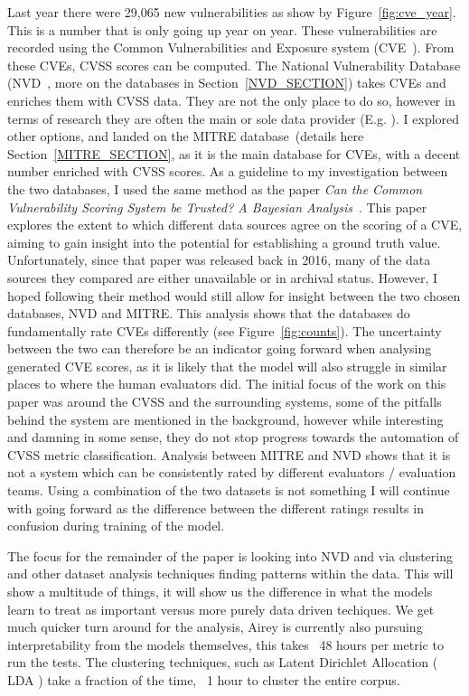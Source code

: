 \documentclass[12pt]{article}
\begin{document}
Last year there were 29,065 new vulnerabilities as show by Figure~\ref{fig:cve_year}. This is a
number that is only going up year on year. These vulnerabilities are recorded using the Common
Vulnerabilities and Exposure system (CVE~\cite{CVE}). From these CVEs, CVSS scores can be computed.
The National Vulnerability Database (NVD~\cite{NVD}, more on the databases in
Section~\ref{NVD_SECTION}) takes CVEs and enriches them with CVSS data. They are not the only place
to do so, however in terms of research they are often the main or sole data provider (E.g.\@
\cite{costa, nvd_example1, nvd_example2}).  I explored other options, and landed on the MITRE
database~\cite{MITRE}(details here Section~\ref{MITRE_SECTION}, as it is the main database for CVEs,
with a decent number enriched with CVSS scores. As a guideline to my investigation between the two
databases, I used the same method as the paper \textit{Can the Common Vulnerability Scoring System
	be Trusted? A Bayesian Analysis}~\cite{bayes}. This paper explores the extent to which different
data sources agree on the scoring of a CVE, aiming to gain insight into the potential for
establishing a ground truth value. Unfortunately, since that paper was released back in 2016, many
of the data sources they compared are either unavailable or in archival status. However, I hoped following
their method would still allow for insight between the two chosen databases, NVD and MITRE. This analysis
shows that the databases do fundamentally rate CVEs differently (see Figure~\ref{fig:counts}). The
uncertainty between the two can therefore be an indicator going forward when analysing generated CVE
scores, as it is likely that the model will also struggle in similar places to where the human
evaluators did. The initial focus of the work on this paper was around the CVSS and the surrounding
systems, some of the pitfalls behind the system are mentioned in the background, however while
interesting and damning in some sense, they do not stop progress towards the automation of CVSS
metric classification. Analysis between MITRE and NVD shows that it is not a system which can be
consistently rated by different evaluators / evaluation teams. Using a combination of the two
datasets is not something I will continue with going forward as the difference between the different
ratings results in confusion during training of the model.

The focus for the remainder of the paper is looking into NVD and via clustering and other dataset
analysis techniques finding patterns within the data. This will show a multitude of things, it will
show us the difference in what the models learn to treat as important versus more purely data driven
techiques. We get much quicker turn around for the analysis, Airey is currently also pursuing
interpretability from the models themselves, this takes ~48 hours per metric to run the tests. The
clustering techniques, such as Latent Dirichlet Allocation ( LDA ) take a fraction of the time, ~1
hour to cluster the entire corpus.
\end{document}
